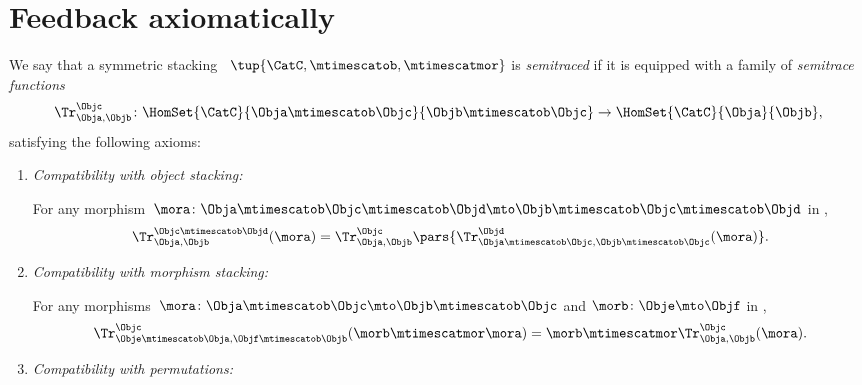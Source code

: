 \section{Feedback axiomatically}

\begin{ctdefinition}
    \label{def:semitraced-assoc-stack-scat}
    We say that a symmetric stacking ~$\tup{\CatC, \mtimescatob, \mtimescatmor}$ is \emph{semitraced} if it is equipped with a family of \emph{semitrace functions}
    \begin{equation}
        \Tr_{\Obja,\Objb}^\Objc\colon \HomSet{\CatC}{\Obja \mtimescatob \Objc}{\Objb\mtimescatob \Objc}\to \HomSet{\CatC}{\Obja}{\Objb},
    \end{equation}
    satisfying the following axioms:
    \begin{enumerate}

        \item \emph{Compatibility with object stacking:}

              For any morphism~$\mora \colon \Obja\mtimescatob \Objc \mtimescatob \Objd \mto \Objb\mtimescatob \Objc \mtimescatob \Objd$ in \CatC,
              \begin{equation}
                  \label{eq:semicat-semitrace-vanishing_2}
                  \Tr_{\Obja,\Objb}^{\Objc\mtimescatob \Objd}(\mora)=\Tr_{\Obja,\Objb}^\Objc\pars{
                      \Tr_{\Obja \mtimescatob \Objc, \Objb \mtimescatob \Objc}^\Objd(\mora)}.
              \end{equation}

        \item \emph{Compatibility with morphism stacking:}

              For any morphisms~$\mora\colon \Obja\mtimescatob \Objc \mto \Objb\mtimescatob \Objc$ and $\morb \colon \Obje \mto \Objf$ in \CatC,
              \begin{equation}
                  \label{eq:semicat-semitrace-superposing}
                  \Tr_{\Obje\mtimescatob \Obja,\Objf\mtimescatob \Objb}^{\Objc}(\morb \mtimescatmor \mora)=\morb \mtimescatmor \Tr_{\Obja,\Objb}^\Objc(\mora).
              \end{equation}

        \item \emph{Compatibility with permutations:}


    \end{enumerate}
\end{ctdefinition}

